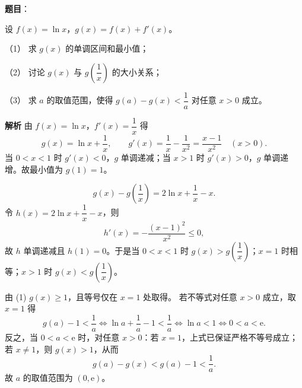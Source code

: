 \begin{answer}

\textbf{题目}：

设 $f(x)=\ln x$，$g(x)=f(x)+f'(x)$。

（1） 求 $g(x)$ 的单调区间和最小值；

（2） 讨论 $g(x)$ 与 $g\left(\dfrac1x\right)$ 的大小关系；

（3） 求 $a$ 的取值范围，使得 $g(a)-g(x)<\dfrac1a$ 对任意 $x>0$ 成立。

\clearpage

\textbf{解析}
由 $f(x)=\ln x$，$f'(x)=\dfrac1x$ 得
\nopagebreak[4]
\[g(x)=\ln x+\frac1x,\qquad g'(x)=\frac1x-\frac1{x^2}=\frac{x-1}{x^2}\quad(x>0).\]
当 $0<x<1$ 时 $g'(x)<0$，$g$ 单调递减；当 $x>1$ 时 $g'(x)>0$，$g$ 单调递增。故最小值为 $g(1)=1$。

\nopagebreak[4]
\[g(x)-g\left(\frac1x\right)=2\ln x+\frac1x-x.\]
令 $h(x)=2\ln x+\dfrac1x-x$，则
\nopagebreak[4]
\[h'(x)=-\frac{(x-1)^2}{x^2}\leqslant0,\]
故 $h$ 单调递减且 $h(1)=0$。于是当 $0<x<1$ 时 $g(x)>g\left(\dfrac1x\right)$；$x=1$ 时相等；$x>1$ 时 $g(x)<g\left(\dfrac1x\right)$。

由 (1) $g(x)\geqslant1$，且等号仅在 $x=1$ 处取得。
若不等式对任意 $x>0$ 成立，取 $x=1$ 得
\nopagebreak[4]
\[g(a)-1<\frac1a\Longleftrightarrow\ln a+\frac1a-1<\frac1a\Longleftrightarrow\ln a<1\Longleftrightarrow0<a<\mathrm e.\]
反之，当 $0<a<\mathrm e$ 时，对任意 $x>0$：若 $x=1$，上式已保证严格不等号成立；若 $x\ne1$，则 $g(x)>1$，从而
\nopagebreak[4]
\[g(a)-g(x)<g(a)-1<\frac1a.\]
故 $a$ 的取值范围为 $(0,\mathrm e)$。




\end{answer}